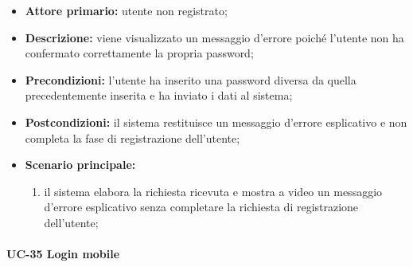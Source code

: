 	\begin{itemize}
		\item \textbf{Attore primario:} utente non registrato;

		\item \textbf{Descrizione:} viene visualizzato un messaggio d'errore poiché l'utente non ha confermato correttamente la propria password;

		\item \textbf{Precondizioni:} l'utente ha inserito una password diversa da quella precedentemente inserita e ha inviato i dati al sistema;

		\item \textbf{Postcondizioni:} il sistema restituisce un messaggio d'errore esplicativo e non completa la fase di registrazione dell'utente;

		\item \textbf{Scenario principale:}
	  		\begin{enumerate}
		  		\item il sistema elabora la richiesta ricevuta e mostra a video un messaggio d'errore esplicativo senza completare la richiesta di registrazione dell'utente; 
	  		\end{enumerate}
	\end{itemize}

    
\paragraph{UC-35 Login mobile}

